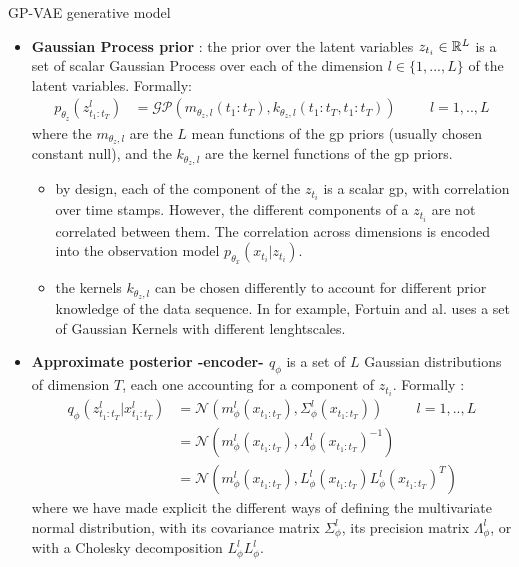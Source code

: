 \begin{frame}{GP-VAE generative model}
    \begin{itemize}
        \item \textbf{Gaussian Process prior} : the prior over the latent variables $z_{t_i} \in \mathbb{R}^L$ is a set of scalar Gaussian Process over each of the dimension $l \in \{1,...,L\}$ of the latent variables. Formally:
            \begin{align}
                p_{\theta_z}(z_{t_1:t_T}^l) &= \mathcal{GP}(m_{\theta_z, l}(t_1:t_T), k_{\theta_z, l}(t_1:t_T, t_1:t_T)) \hspace{1cm} l=1,..,L
            \end{align}
            where the $m_{\theta_z, l}$ are the $L$ mean functions of the \gls{gp} priors (usually chosen constant null), and the $k_{\theta_z, l}$ are the kernel functions of the \gls{gp} priors.
            \begin{itemize}
                \item by design, each of the component of the $z_{t_i}$ is a scalar \gls{gp}, with correlation over time stamps. However, the different components of a $z_{t_i}$ are not correlated between them. The correlation across dimensions is encoded into the observation model $p_{\theta_x}(x_{t_i} \vert z_{t_i})$.
                \item the kernels $k_{\theta_z, l}$ can be chosen differently to account for different prior knowledge of the data sequence. In \cite{fortuin_gp-vae:_2020} for example, Fortuin and al. uses a set of Gaussian Kernels with different lenghtscales.
            \end{itemize}
        \item \textbf{Approximate posterior -encoder- $q_\phi$} is a set of $L$ Gaussian distributions of dimension $T$, each one accounting for a component of $z_{t_i}$. Formally :
            \begin{align}
                q_\phi(z_{t_1:t_T}^l \vert x_{t_1:t_T}^l) &= \mathcal{N}(m_{\phi}^l(x_{t_1:t_T}), \Sigma_{\phi}^l(x_{t_1:t_T})) \hspace{1cm} l=1,..,L \\
                &= \mathcal{N}(m_{\phi}^l(x_{t_1:t_T}), \Lambda_{\phi}^l(x_{t_1:t_T})^{-1}) \\
                &= \mathcal{N}(m_{\phi}^l(x_{t_1:t_T}), L_{\phi}^l(x_{t_1:t_T})L_{\phi}^l(x_{t_1:t_T})^T)
            \end{align}
            where we have made explicit the different ways of defining the multivariate normal distribution, with its covariance matrix $\Sigma_\phi^l$, its precision matrix $\Lambda_\phi^l$, or with a Cholesky decomposition $L_{\phi}^lL_{\phi}^l$.
    \end{itemize}
\end{frame}


